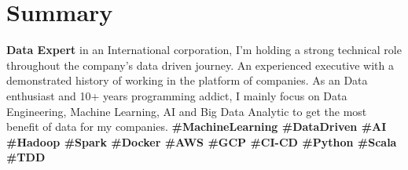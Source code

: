 \section{Summary}
  \textbf{Data Expert} in an International corporation, I’m holding a strong technical role throughout the company’s data driven journey. An experienced executive with a demonstrated history of working in the platform of companies. As an Data enthusiast and 10+ years programming addict, I mainly focus on Data Engineering, Machine Learning, AI and Big Data Analytic to get the most benefit of data for my companies.
  \textbf{\scriptsize{
    \#MachineLearning
    \#DataDriven
    \#AI
    \#Hadoop
    \#Spark
    \#Docker
    \#AWS
    \#GCP
    \#CI-CD
    \#Python
    \#Scala
    \#TDD
  }}
